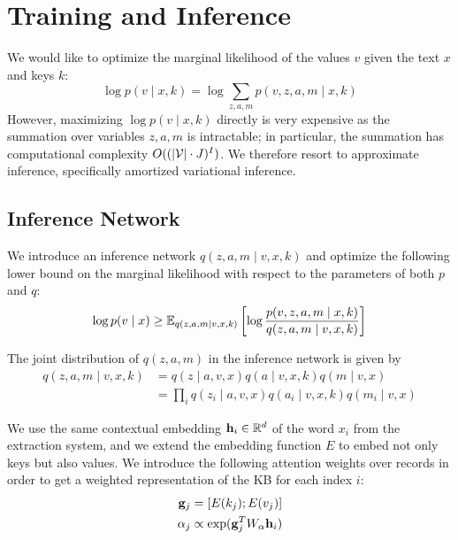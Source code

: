 \documentclass[12pt]{article}
\begin{document}
\section{Training and Inference}
We would like to optimize the marginal likelihood of the values $v$ given the 
text $x$ and keys $k$:
\begin{equation}
\log p(v \mid x,k) = \log \sum_{z,a,m} p(v,z,a,m \mid x,k)
\end{equation}
However, maximizing $\log p(v \mid x,k)$ directly is very expensive 
as the summation over variables $z,a,m$ is intractable;
in particular,
the summation has computational complexity $O((|\mathcal{V}|\cdot J)^{I})$.
We therefore resort to approximate inference,
specifically amortized variational inference.

\subsection{Inference Network}
We introduce an inference network $q(z,a,m\mid v,x,k)$
and optimize the following lower bound on the marginal likelihood
with respect to the parameters of both $p$ and $q$:
\begin{equation}
\label{eqn:lowerbound}
\log p(v\mid x) \geq
\mathbb{E}_{q(z,a,m\mid v,x,k)}\left[\log \frac{p(v,z,a,m\mid x,k)}{q(z,a,m\mid v,x,k)}\right]
\end{equation}

The joint distribution of $q(z,a,m)$ in the inference network is given by
\begin{equation}
\label{eqn:elbo}
\begin{aligned}
q(z,a,m\mid v,x,k) &= q(z \mid a,v,x)q(a\mid v,x,k)q(m \mid v,x)\\
&= \prod_i q(z_i \mid a,v,x)q(a_i \mid v,x,k)q(m_i \mid v,x)
\end{aligned}
\end{equation}

We use the same contextual embedding $\mathbf{h}_i \in \mathbb{R}^d$ of the word $x_i$
from the extraction system,
and we extend the embedding function $E$ to embed not only keys but also values.
We introduce the following attention weights over records
in order to get a weighted representation
of the KB for each index $i$:
\begin{equation}
\label{eqn:attn}
\begin{aligned}
\mathbf{g}_j &= [E(k_j); E(v_j)]\\
\alpha_j &\propto \exp(\mathbf{g}_{j}^T W_\alpha \mathbf{h}_i)
\end{aligned}
\end{equation}
\end{document}
